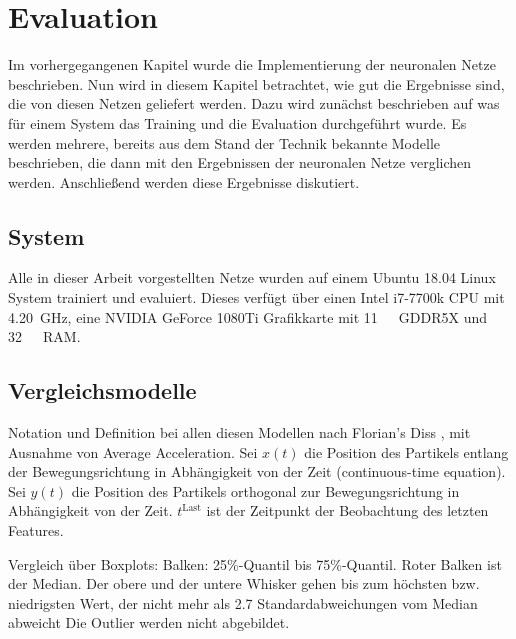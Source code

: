 \chapter{Evaluation}
\label{cap:Eval}

Im vorhergegangenen Kapitel wurde die Implementierung der neuronalen Netze beschrieben.
Nun wird in diesem Kapitel betrachtet, wie gut die Ergebnisse sind, die von diesen Netzen geliefert werden.
Dazu wird zunächst beschrieben auf was für einem System das Training und die Evaluation durchgeführt wurde.
Es werden mehrere, bereits aus dem Stand der Technik bekannte Modelle beschrieben, die dann mit den Ergebnissen der neuronalen Netze 
verglichen werden.
Anschließend werden diese Ergebnisse diskutiert.

\section{System}

Alle in dieser Arbeit vorgestellten Netze wurden auf einem Ubuntu 18.04 Linux System trainiert und evaluiert.
Dieses verfügt über einen Intel i7-7700k CPU mit \SI{4.20}{\giga\hertz}, eine NVIDIA GeForce 1080Ti Grafikkarte mit \SI{11}{\giga\byte}~GDDR5X
und \SI{32}{\giga\byte}~RAM. 


\section{Vergleichsmodelle}

\color{blue}
Notation und Definition bei allen diesen Modellen nach Florian's Diss \cite{Pfaff2018}, mit Ausnahme von Average Acceleration.
Sei \(x(t)\) die Position des Partikels entlang der Bewegungsrichtung in Abhängigkeit von der Zeit
(continuous-time equation).
Sei \( y(t)\) die Position des Partikels orthogonal zur Bewegungsrichtung in Abhängigkeit von der Zeit.
\(t^{\text{Last}}\) ist der Zeitpunkt der Beobachtung des letzten Features.

Vergleich über Boxplots: Balken: 25\%-Quantil bis 75\%-Quantil.
Roter Balken ist der Median. Der obere und der untere Whisker 
gehen bis zum höchsten bzw. niedrigsten Wert, der nicht mehr als 2.7 Standardabweichungen vom Median abweicht
Die Outlier werden nicht abgebildet.

